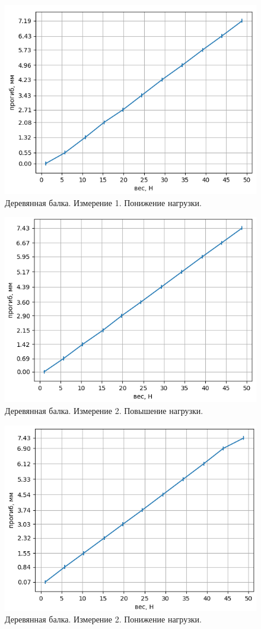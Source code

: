 \documentclass{article}
\begin{document}
\begin{figure}
    \centering
    \includegraphics[width=0.9\linewidth]{дерево 1 убыв.png}
    \caption{Деревянная балка. Измерение 1. Понижение нагрузки.}
    \label{fig:enter-label}
\end{figure}

\begin{figure}
    \centering
    \includegraphics[width=0.9\linewidth]{дерево 2 возраст.png}
    \caption{Деревянная балка. Измерение 2. Повышение нагрузки.}
    \label{fig:enter-label}
\end{figure}

\begin{figure}
    \centering
    \includegraphics[width=0.9\linewidth]{дерево 2 убыв.png}
    \caption{Деревянная балка. Измерение 2. Понижение нагрузки.}
    \label{fig:enter-label}
\end{figure}
\end{document}
